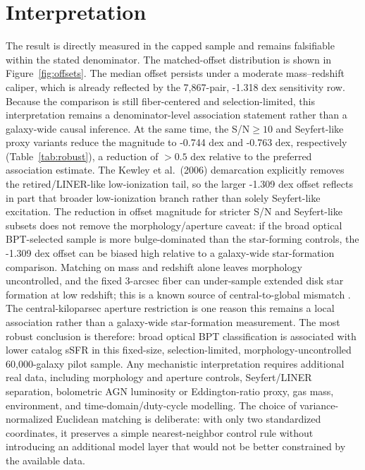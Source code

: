 \documentclass[twocolumn]{aastex631}
\begin{document}
\section{Interpretation}
The result is directly measured in the capped sample and remains falsifiable within the stated denominator. The matched-offset distribution is shown in Figure~\ref{fig:offsets}. The median offset persists under a moderate mass--redshift caliper, which is already reflected by the 7,867-pair, -1.318 dex sensitivity row. Because the comparison is still fiber-centered and selection-limited, this interpretation remains a denominator-level association statement rather than a galaxy-wide causal inference. At the same time, the S/N$\geq10$ and Seyfert-like proxy variants reduce the magnitude to -0.744 dex and -0.763 dex, respectively (Table~\ref{tab:robust}), a reduction of $>0.5$ dex relative to the preferred association estimate. The Kewley et al.\ (2006) demarcation explicitly removes the retired/LINER-like low-ionization tail, so the larger -1.309 dex offset reflects in part that broader low-ionization branch rather than solely Seyfert-like excitation. The reduction in offset magnitude for stricter S/N and Seyfert-like subsets does not remove the morphology/aperture caveat: if the broad optical BPT-selected sample is more bulge-dominated than the star-forming controls, the -1.309 dex offset can be biased high relative to a galaxy-wide star-formation comparison. Matching on mass and redshift alone leaves morphology uncontrolled, and the fixed 3-arcsec fiber can under-sample extended disk star formation at low redshift; this is a known source of central-to-global mismatch \citep[e.g.,][]{harrison2017,ellison2021}. The central-kiloparsec aperture restriction is one reason this remains a local association rather than a galaxy-wide star-formation measurement. The most robust conclusion is therefore: broad optical BPT classification is associated with lower catalog sSFR in this fixed-size, selection-limited, morphology-uncontrolled 60,000-galaxy pilot sample. Any mechanistic interpretation requires additional real data, including morphology and aperture controls, Seyfert/LINER separation, bolometric AGN luminosity or Eddington-ratio proxy, gas mass, environment, and time-domain/duty-cycle modelling.
The choice of variance-normalized Euclidean matching is deliberate: with only two standardized coordinates, it preserves a simple nearest-neighbor control rule without introducing an additional model layer that would not be better constrained by the available data.
\end{document}
